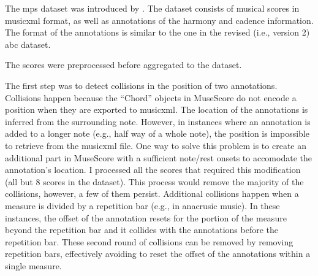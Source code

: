 

The \gls{mps} dataset was introduced by
\textcite{hentschel2021annotated}. The dataset consists of
musical scores in \gls{musicxml} format, as well as annotations of
the harmony and cadence information. The format of the
annotations is similar to the one in the revised (i.e.,
version 2) \gls{abc} dataset.


The scores were preprocessed before aggregated to the
dataset.

The first step was to detect collisions in the position of
two annotations. Collisions happen because the ``Chord''
objects in MuseScore do not encode a position when they are
exported to \gls{musicxml}. The location of the annotations is
inferred from the surrounding note. However, in instances
where an annotation is added to a longer note (e.g., half
way of a whole note), the position is impossible to retrieve
from the \gls{musicxml} file. One way to solve this problem is to
create an additional part in MuseScore with a sufficient
note/rest onsets to accomodate the annotation's location. I
processed all the scores that required this modification
(all but 8 scores in the dataset). This process would remove
the majority of the collisions, however, a few of them
persist. Additional collisions happen when a measure is
divided by a repetition bar (e.g., in anacrusic music). In
these instances, the offset of the annotation resets for the
portion of the measure beyond the repetition bar and it
collides with the annotations before the repetition bar.
These second round of collisions can be removed by removing
repetition bars, effectively avoiding to reset the offset of
the annotations within a single measure.
